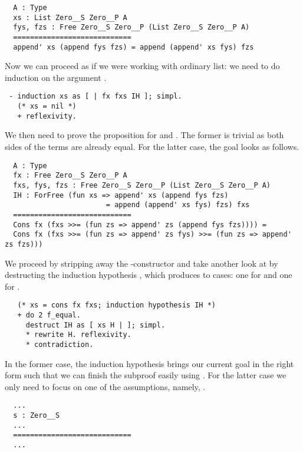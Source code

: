 \begin{verbatim}
  A : Type
  xs : List Zero__S Zero__P A
  fys, fzs : Free Zero__S Zero__P (List Zero__S Zero__P A)
  ============================
  append' xs (append fys fzs) = append (append' xs fys) fzs
\end{verbatim}

Now we can proceed as if we were working with ordinary list: we need
to do induction on the  argument .

\begin{verbatim}
 - induction xs as [ | fx fxs IH ]; simpl.
   (* xs = nil *)
   + reflexivity.
\end{verbatim}
 
We then need to prove the proposition for  and .
The former is trivial as both sides of the terms are already equal.
For the latter case, the goal looks as follows.

\begin{verbatim}
  A : Type
  fx : Free Zero__S Zero__P A
  fxs, fys, fzs : Free Zero__S Zero__P (List Zero__S Zero__P A)
  IH : ForFree (fun xs => append' xs (append fys fzs)
                        = append (append' xs fys) fzs) fxs
  ============================
  Cons fx (fxs >>= (fun zs => append' zs (append fys fzs)))) =
  Cons fx (fxs >>= (fun zs => append' zs fys) >>= (fun zs => append' zs fzs)))
\end{verbatim}

We proceed by stripping away the -constructor and take
another look at  by destructing the induction hypothesis
, which produces to cases: one for  and one for
.

\begin{verbatim}
   (* xs = cons fx fxs; induction hypothesis IH *)
   + do 2 f_equal.
     destruct IH as [ xs H | ]; simpl.
     * rewrite H. reflexivity.
     * contradiction.
\end{verbatim}

In the former case, the induction hypothesis brings our current goal
in the right form such that we can finish the subproof easily using
.
For the latter case we only need to focus on one of the assumptions,
namely, .

\begin{verbatim}
  ...
  s : Zero__S
  ...
  ============================
  ...
\end{verbatim}

